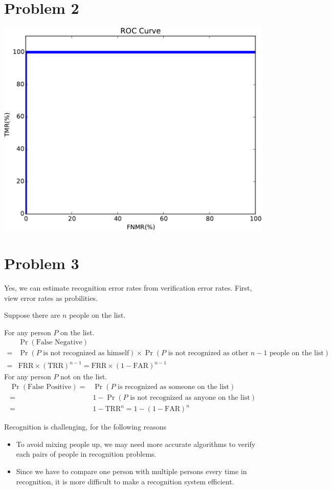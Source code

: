 \documentclass[12pt]{article}
\begin{document}
\section*{Problem 2}
\includegraphics[scale=0.5]{fig-p12-crop}
\section*{Problem 3}
Yes, we can estimate recognition error rates from verification error rates.
First, view error rates as probilities.

Suppose there are $n$ people on the list.

For any person $P$ on the list. 
$$
\begin{aligned}
    &\Pr(\text{False Negative}) \\ 
    =&\Pr(P \text{ is not recognized as himself})\times\Pr(P \text{ is not recognized as other } n-1 \text{ people on the list})\\
    =&\text{FRR}\times(\text{TRR})^{n-1}=\text{FRR}\times(1-\text{FAR})^{n-1}
\end{aligned}
$$
For any person $P$ not on the list. 
$$
\begin{aligned}
    \Pr(\text{False Positive}) =&\Pr(P \text{ is recognized as someone on the list})\\
    =& 1 - \Pr(P \text{ is not recognized as anyone on the list})\\
    =& 1 - \text{TRR}^n = 1-(1-\text{FAR})^n
\end{aligned}
$$

Recognition is challenging, for the following reasons
\begin{itemize}
    \item To avoid mixing people up, we may need more accurate algorithms to verify each pairs of people in recognition problems.
    \item Since we have to compare one person with multiple persons every time in recognition, it is more difficult to make a recognition system efficient. 
\end{itemize}
\end{document}
